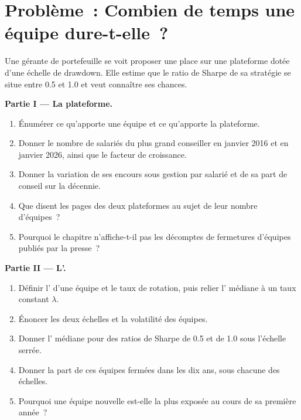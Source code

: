 \section{Problème~: Combien de temps une équipe dure-t-elle~?}

\begin{problem}\label{pb:in:multi-manager-platforms:1}
Une gérante de portefeuille se voit proposer une place sur une plateforme dotée d'une échelle de drawdown. Elle estime que le ratio de Sharpe de sa stratégie se situe
entre 0.5 et 1.0 et veut connaître ses chances.

\medskip\noindent\textbf{Partie I --- La plateforme.}
\begin{enumerate}
\item Énumérer ce qu'apporte une équipe et ce qu'apporte la plateforme.
\item Donner le nombre de salariés du plus grand conseiller en janvier 2016 et en janvier 2026, ainsi que le facteur de croissance.
\item Donner la variation de ses encours sous gestion par salarié et de sa part de conseil sur la décennie.
\item Que disent les pages des deux plateformes au sujet de leur nombre d'équipes~?
\item Pourquoi le chapitre n'affiche-t-il pas les décomptes de fermetures d'équipes publiés par la presse~?
\end{enumerate}

\medskip\noindent\textbf{Partie II --- L'.}
\begin{enumerate}[resume]
\item Définir l' d'une équipe et le taux de rotation, puis relier l' médiane à un taux constant $\lambda$.
\item Énoncer les deux échelles et la volatilité des équipes.
\item Donner l' médiane pour des ratios de Sharpe de 0.5 et de 1.0 sous l'échelle serrée.
\item Donner la part de ces équipes fermées dans les dix ans, sous chacune des échelles.
\item Pourquoi une équipe nouvelle est-elle la plus exposée au cours de sa première année~?
\end{enumerate}


\end{problem}

